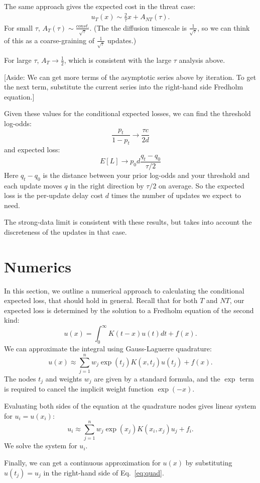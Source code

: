 \documentclass[12pt, letterpaper]{article}
\begin{document}
The same approach gives the expected cost in the threat case:
\begin{align}
    u_{T}(x) \sim \frac{2}{\tau} x + A_{NT}(\tau).
\end{align}
For small $\tau$, $A_{T}(\tau) \sim \frac{const.}{\sqrt{\tau}}$.
(The the diffusion timescale is $\frac{1}{\sqrt{\tau}}$, so we can think of this as a coarse-graining of $\frac{1}{\sqrt{\tau}}$ updates.)

For large $\tau$, $A_{T} \to \frac{1}{2}$, which is consistent with the large $\tau$ analysis above.

[Aside: We can get more terms of the asymptotic series above by iteration. To get the next term, substitute the current series into the right-hand side Fredholm equation.]

Given these values for the conditional expected losses, we can find the threshold log-odds:
\begin{equation}\frac{p_t}{1 - p_t} \to \frac{\tau c}{2 d}\end{equation}
and expected loss:
\begin{equation}E[L] \to p_0 d \frac{q_t - q_0}{\tau / 2}\end{equation}
Here $q_t - q_0$ is the distance between your prior log-odds and your threshold and each update moves $q$ in the right direction by $\tau / 2$ on average.
So the expected loss is the per-update delay cost $d$ times the number of updates we expect to need.

The strong-data limit is consistent with these results, but takes into account the discreteness of the updates in that case.

\section{Numerics}

In this section, we outline a numerical approach to calculating the conditional expected loss, that should hold in general.
Recall that for both $T$ and $NT$, our expected loss is determined by the solution to a Fredholm equation of the second kind:
\begin{equation}
    u(x) = \int_{0}^{\infty} K(t-x) u(t) dt + f(x).
\end{equation}
We can approximate the integral using Gauss-Laguerre quadrature:
\begin{equation}
    u(x) \approx \sum_{j=1}^{n} w_j \exp(t_j) K(x, t_j) u(t_j) + f(x) \label{eq:quad}.
\end{equation}
The nodes $t_j$ and weights $w_j$ are given by a standard formula, and the $\exp$ term is required to cancel the implicit weight function $\exp(-x)$.

Evaluating both sides of the equation at the quadrature nodes gives linear system for $u_i = u(x_i)$:
\begin{equation}
    u_i \approx \sum_{j=1}^{n} w_j \exp(x_j) K(x_i, x_j) u_j + f_i.
\end{equation}
We solve the system for $u_i$.

Finally, we can get a continuous approximation for $u(x)$ by substituting $u(t_j) = u_j$ in the right-hand side of Eq.~\ref{eq:quad}.
\end{document}

